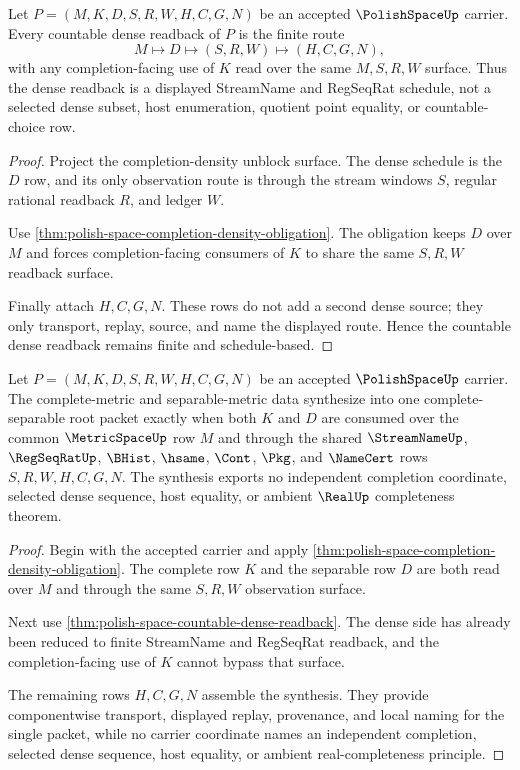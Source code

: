 \begin{theorem}
\label{thm:polish-space-countable-dense-readback}
Let $P=(M,K,D,S,R,W,H,C,G,N)$ be an accepted $\PolishSpaceUp$ carrier. Every
countable dense readback of $P$ is the finite route
$$
M \longmapsto D \longmapsto (S,R,W) \longmapsto (H,C,G,N),
$$
with any completion-facing use of $K$ read over the same $M,S,R,W$ surface.
Thus the dense readback is a displayed StreamName and RegSeqRat schedule, not
a selected dense subset, host enumeration, quotient point equality, or
countable-choice row.
\end{theorem}
\begin{proof}
Project the completion-density unblock surface. The dense schedule is the
$D$ row, and its only observation route is through the stream windows $S$,
regular rational readback $R$, and ledger $W$.

Use \autoref{thm:polish-space-completion-density-obligation}. The obligation
keeps $D$ over $M$ and forces completion-facing consumers of $K$ to share the
same $S,R,W$ readback surface.

Finally attach $H,C,G,N$. These rows do not add a second dense source; they
only transport, replay, source, and name the displayed route. Hence the
countable dense readback remains finite and schedule-based.
\end{proof}

\begin{theorem}
\label{thm:polish-space-complete-metric-separable-synthesis}
Let $P=(M,K,D,S,R,W,H,C,G,N)$ be an accepted $\PolishSpaceUp$ carrier. The
complete-metric and separable-metric data synthesize into one
complete-separable root packet exactly when both $K$ and $D$ are consumed over
the common $\MetricSpaceUp$ row $M$ and through the shared
$\StreamNameUp$, $\RegSeqRatUp$, $\BHist$, $\hsame$, $\Cont$, $\Pkg$, and
$\NameCert$ rows $S,R,W,H,C,G,N$. The synthesis exports no independent
completion coordinate, selected dense sequence, host equality, or ambient
$\RealUp$ completeness theorem.
\end{theorem}
\begin{proof}
Begin with the accepted carrier and apply
\autoref{thm:polish-space-completion-density-obligation}. The complete row
$K$ and the separable row $D$ are both read over $M$ and through the same
$S,R,W$ observation surface.

Next use \autoref{thm:polish-space-countable-dense-readback}. The dense side
has already been reduced to finite StreamName and RegSeqRat readback, and the
completion-facing use of $K$ cannot bypass that surface.

The remaining rows $H,C,G,N$ assemble the synthesis. They provide
componentwise transport, displayed replay, provenance, and local naming for
the single packet, while no carrier coordinate names an independent
completion, selected dense sequence, host equality, or ambient
real-completeness principle.
\end{proof}

